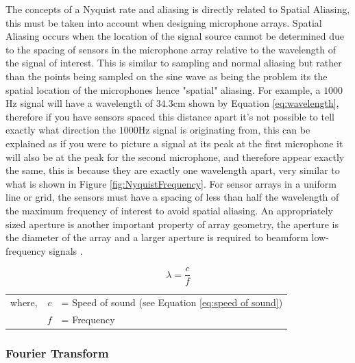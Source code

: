 \documentclass{UoNMCHA}
\numberwithin{equation}{section}
\begin{document}
    The concepts of a Nyquist rate and aliasing is directly related to Spatial Aliasing, this must be taken into account when designing microphone arrays. Spatial Aliasing occurs when the location of the signal source cannot be determined due to the spacing of sensors in the microphone array relative to the wavelength of the signal of interest. This is similar to sampling and normal aliasing but rather than the points being sampled on the sine wave as being the problem its the spatial location of the microphones hence "spatial" aliasing. For example, a $1000$Hz signal will have a wavelength of $34.3$cm shown by Equation \ref{eq:wavelength}, therefore if you have sensors spaced this distance apart it's not possible to tell exactly what direction the $1000$Hz signal is originating from, this can be explained as if you were to picture a signal at its peak at the first microphone it will also be at the peak for the second microphone, and therefore appear exactly the same, this is because they are exactly one wavelength apart, very similar to what is shown in Figure \ref{fig:NyquistFrequency}. For sensor arrays in a uniform line or grid, the sensors must have a spacing of less than half the wavelength of the maximum frequency of interest to avoid spatial aliasing. An appropriately sized aperture is another important property of array geometry, the aperture is the diameter of the array and a larger aperture is required to beamform low-frequency signals \citep{Ami08}.
	
	\begin{equation}
		\lambda = \frac{c}{f}
		\label{eq:wavelength}
	\end{equation}
	\begin{table}[H]
    \centering
        \begin{tabular}{lrl}
            where, & $c$ &= Speed of sound (see Equation \ref{eq:speed of sound}) \\
             & $f$ &= Frequency 
        \end{tabular}
    \end{table}
    
\subsubsection{Fourier Transform} \label{sec:Fourier Transform}
\end{document}
